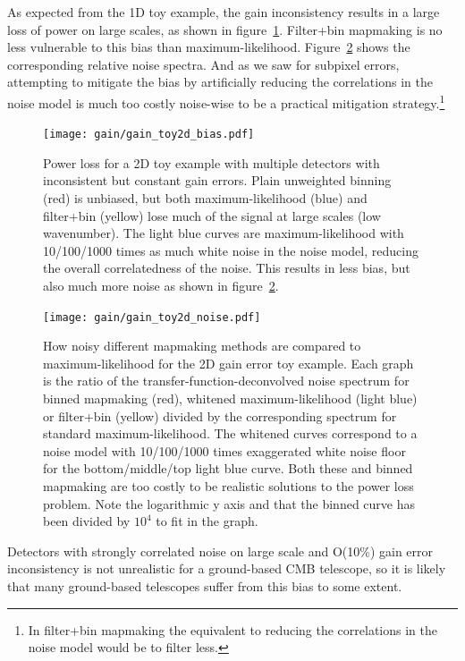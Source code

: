 \documentclass{aa}
\begin{document}
As expected from the 1D toy example, the gain inconsistency results
in a large loss of power on large scales, as shown in figure~\ref{fig:gain-tf-2d}.
Filter+bin mapmaking is no less vulnerable to this bias than maximum-likelihood.
Figure~\ref{fig:gain-noise-2d} shows the corresponding relative noise spectra.
And as we saw for subpixel errors, attempting to mitigate the bias by
artificially reducing the correlations in the noise model is much too
costly noise-wise to be a practical mitigation strategy.\footnote{In filter+bin
mapmaking the equivalent to reducing the correlations in the noise model would be
to filter less.}
\begin{figure}
	\centering
	\texttt{[image: gain/gain\_toy2d\_bias.pdf]}
	\caption{Power loss for a 2D toy example with multiple detectors
	with inconsistent but constant gain errors. Plain unweighted binning
	(red) is unbiased, but both maximum-likelihood (blue) and filter+bin
	(yellow) lose much of the signal at large scales (low wavenumber).
	The light blue curves are maximum-likelihood with 10/100/1000 times
	as much white noise in the noise model, reducing the overall correlatedness of the noise.
	This results in less bias, but also much more noise as shown in figure~\ref{fig:gain-noise-2d}.}
	\label{fig:gain-tf-2d}
\end{figure}
\begin{figure}
	\centering
	\texttt{[image: gain/gain\_toy2d\_noise.pdf]}
	\caption{How noisy different mapmaking methods are compared to maximum-likelihood
	for the 2D gain error toy example. Each graph is the ratio of the transfer-function-deconvolved
	noise spectrum for binned mapmaking (red), whitened maximum-likelihood (light blue)
	or filter+bin (yellow) divided by the corresponding spectrum for standard maximum-likelihood.
	The whitened curves correspond to a noise model with 10/100/1000 times exaggerated
	white noise floor for the bottom/middle/top light blue curve. Both these and binned mapmaking
	are too costly to be realistic solutions to the power loss problem. Note the logarithmic
	y axis and that the binned curve has been divided by $10^4$ to fit in the graph.}
	\label{fig:gain-noise-2d}
\end{figure}

Detectors with strongly correlated noise on large scale and O(10\%) gain
error inconsistency is not unrealistic for a ground-based CMB telescope,
so it is likely that many ground-based telescopes suffer from this bias to
some extent.
\end{document}
